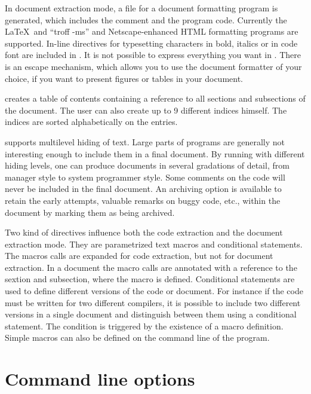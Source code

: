 In document extraction mode, a file for a document formatting program
is generated, which includes the comment and the program code.
Currently the \LaTeX\ and ``troff -ms'' and Netscape-enhanced HTML 
formatting programs are supported. 
In-line directives for typesetting characters in bold,
italics or in code font are included in \Mx. It is not possible to
express everything you want in \Mx. There is an escape mechanism,
which allows you to use the document formatter of your choice, if you
want to present figures or tables in your document.

\Mx creates a table of contents containing a reference to all sections
and subsections of the document. The user can also create up to 9
different indices himself. The indices are sorted
alphabetically on the entries.

\Mx supports multilevel hiding of text. Large parts of
programs are generally not interesting enough to include them in a
final document. By running \Mx with different
hiding levels, one can produce documents in several gradations of
detail, from manager style to system programmer style.
Some comments on the code will never be included in the final
document. An archiving option is available to retain the early
attempts, valuable remarks on buggy code, etc.,  
within the \Mx document by marking them as being archived.

Two kind of directives influence both the code extraction and the
document extraction mode. They are parametrized text macros and 
conditional statements. The macros calls are expanded for code extraction,
but not for document extraction. In a document the macro calls are
annotated with a reference to the sextion and subsection, where
the macro is defined.
Conditional statements are used to define different versions of the
code or document. For instance if the code must be written for two
different compilers, it is possible to include two different versions
in a single document and distinguish between them using a conditional
statement. The condition is triggered by the existence of a macro
definition. Simple macros can also be defined on the command line of
the \Mx program. 

\newpage
\section{Command line options}
\newcommand{\macro}{{$<${\it macro}$>$}}
\newcommand{\file}{{$<${\it file}$>$}}
\newcommand{\text}{{$<${\it text}$>$}}
\newcommand{\mxfile}{{\file{\bf .mx}}}
\newcommand{\example}[2]{
	\begin{table}
	\begin{tabular}{|lp{0.5 \linewidth}|}\hline #2 \hline \end{tabular}
	\caption{#1}
	\end{table}}
\newcommand{\n}{$<n>$}

